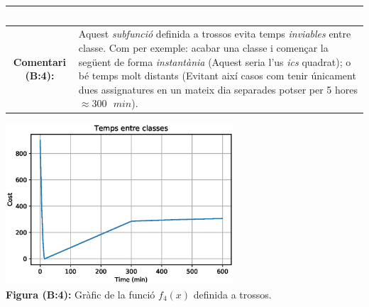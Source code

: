 \documentclass[10pt,twocolumn]{article}
\newcommand{\esp}{\text{ }}
\begin{document}
\begin{itemize}[$\RHD$]
\begin{tabular}{|c|m{50mm}|}
      $\esp$
	\\ 
\hline
	\textbf{Comentari (B:4):}& Aquest \textit{subfunció}  definida a trossos evita  temps \textit{inviables} entre classe. Com per exemple: acabar una classe i començar la següent de forma \textit{instantània} (Aquest seria l'us \textit{ics} quadrat); o bé temps molt distants (Evitant així casos com tenir  únicament dues assignatures  en un mateix dia separades potser per 5 hores $\approx 300 \esp min$).\\
	\hline
\end{tabular}
\includegraphics[width=8.5cm]{interc_mf}
\\ 
{
	\textbf{Figura (B:4):} 
	{\footnotesize Gràfic de la funció $f_4(x)$ definida a trossos.
		}}
\end{itemize}
\end{document}
